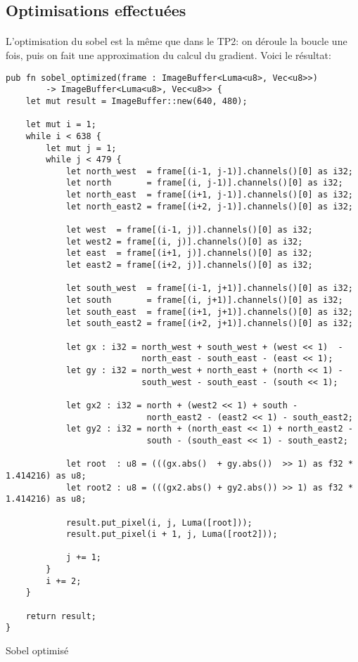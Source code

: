 \documentclass{report}
\begin{document}
\subsection{Optimisations effectuées}

\paragraph{} L'optimisation du sobel est la même que dans le TP2: on déroule la
boucle une fois, puis on fait une approximation du calcul du gradient. Voici
le résultat:

\begin{listing}[H]
\begin{verbatim}
pub fn sobel_optimized(frame : ImageBuffer<Luma<u8>, Vec<u8>>)
		-> ImageBuffer<Luma<u8>, Vec<u8>> {
	let mut result = ImageBuffer::new(640, 480);

	let mut i = 1;
	while i < 638 {
		let mut j = 1;
		while j < 479 {
			let north_west  = frame[(i-1, j-1)].channels()[0] as i32;
			let north       = frame[(i, j-1)].channels()[0] as i32;
			let north_east  = frame[(i+1, j-1)].channels()[0] as i32;
			let north_east2 = frame[(i+2, j-1)].channels()[0] as i32;

			let west  = frame[(i-1, j)].channels()[0] as i32;
			let west2 = frame[(i, j)].channels()[0] as i32;
			let east  = frame[(i+1, j)].channels()[0] as i32;
			let east2 = frame[(i+2, j)].channels()[0] as i32;

			let south_west  = frame[(i-1, j+1)].channels()[0] as i32;
			let south       = frame[(i, j+1)].channels()[0] as i32;
			let south_east  = frame[(i+1, j+1)].channels()[0] as i32;
			let south_east2 = frame[(i+2, j+1)].channels()[0] as i32;

			let gx : i32 = north_west + south_west + (west << 1)  -
			               north_east - south_east - (east << 1);
			let gy : i32 = north_west + north_east + (north << 1) -
			               south_west - south_east - (south << 1);

			let gx2 : i32 = north + (west2 << 1) + south -
			                north_east2 - (east2 << 1) - south_east2;
			let gy2 : i32 = north + (north_east << 1) + north_east2 -
			                south - (south_east << 1) - south_east2;

			let root  : u8 = (((gx.abs()  + gy.abs())  >> 1) as f32 * 1.414216) as u8;
			let root2 : u8 = (((gx2.abs() + gy2.abs()) >> 1) as f32 * 1.414216) as u8;

			result.put_pixel(i, j, Luma([root]));
			result.put_pixel(i + 1, j, Luma([root2]));

			j += 1;
		}
		i += 2;
	}

	return result;
}
\end{verbatim}
\label{lst:sobel_optimized}
\caption{Sobel optimisé}
\end{listing}
\end{document}

